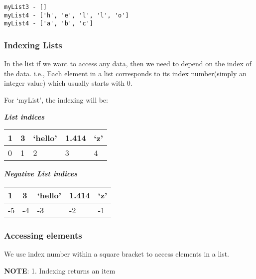 \documentclass[11pt]{article}
\begin{document}
    \begin{Verbatim}[commandchars=\\\{\}]
myList3 - []
myList4 - ['h', 'e', 'l', 'l', 'o']
myList4 - ['a', 'b', 'c']
    \end{Verbatim}

    \hypertarget{indexing-lists}{%
\subsubsection{Indexing Lists}\label{indexing-lists}}

    In the list if we want to access any data, then we need to depend on the
index of the data. i.e., Each element in a list corresponds to its index
number(simply an integer value) which usually starts with 0.

    For `myList', the indexing will be:

    \textbf{\emph{List indices}}

\begin{longtable}[]{@{}lllll@{}}
\toprule
1 & 3 & `hello' & 1.414 & `z' \\
\midrule
\endhead
0 & 1 & 2 & 3 & 4 \\
\bottomrule
\end{longtable}

\textbf{\emph{Negative List indices}}

\begin{longtable}[]{@{}lllll@{}}
\toprule
1 & 3 & `hello' & 1.414 & `z' \\
\midrule
\endhead
-5 & -4 & -3 & -2 & -1 \\
\bottomrule
\end{longtable}

    \hypertarget{accessing-elements}{%
\subsubsection{Accessing elements}\label{accessing-elements}}

    We use index number within a square bracket to access elements in a
list.

\textbf{NOTE}: 1. Indexing returns an item
\end{document}
